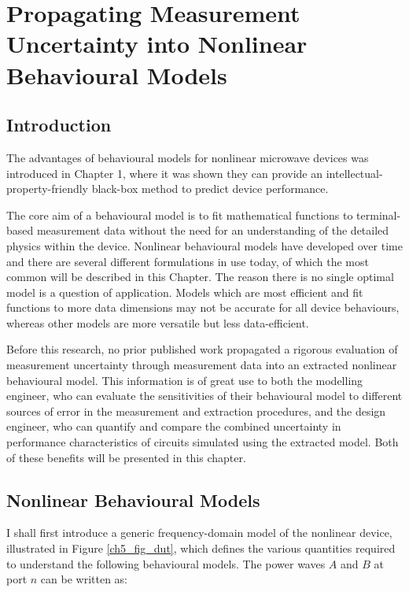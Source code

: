 \documentclass[../thesis/thesis.tex]{subfiles}
\begin{document}
	
\onlyinsubfile{\setcounter{chapter}{4}}

\chapter[Prop. Meas. Unc. To Nonlinear Behavioural Models]{Propagating Measurement Uncertainty into Nonlinear Behavioural Models}
\section{Introduction}

The advantages of behavioural models for nonlinear microwave devices was introduced in Chapter 1, where it was shown they can provide an intellectual-property-friendly black-box method to predict device performance.

The core aim of a behavioural model is to fit mathematical functions to terminal-based measurement data without the need for an understanding of the detailed physics within the device. Nonlinear behavioural models have developed over time and there are several different formulations in use today, of which the most common will be described in this Chapter. The reason there is no single optimal model is a question of application. Models which are most efficient and fit functions to more data dimensions may not be accurate for all device behaviours, whereas other models are more versatile but less data-efficient.

Before this research, no prior published work propagated a rigorous evaluation of measurement uncertainty through measurement data into an extracted nonlinear behavioural model. This information is of great use to both the modelling engineer, who can evaluate the sensitivities of their behavioural model to different sources of error in the measurement and extraction procedures, and the design engineer, who can quantify and compare the combined uncertainty in performance characteristics of circuits simulated using the extracted model. Both of these benefits will be presented in this chapter.


\section{Nonlinear Behavioural Models}

I shall first introduce a generic frequency-domain model of the nonlinear device, illustrated in Figure \ref{ch5_fig_dut}, which defines the various quantities required to understand the following behavioural models. The power waves $A$ and $B$ at port $n$ can be written as:
\end{document}
